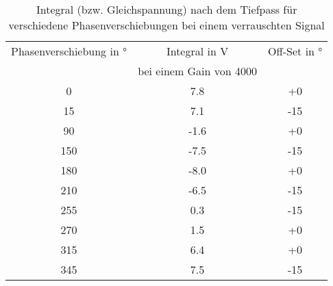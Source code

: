 \begin{table}[h!]
	\begin{center}
		\begin{tabular}{c | c | c}
			Phasenverschiebung in \si{\degree} & Integral in \si{\volt} & Off-Set in \si{\degree} \\
			 & bei einem Gain von 4000 & \\
			\hline
			0   & 7.8 & +0 \\
			15  & 7.1 & -15 \\
			90  & -1.6 & +0 \\
			150 & -7.5 & -15 \\
			180 & -8.0 & +0 \\
			210 & -6.5 & -15 \\
			255 & 0.3 & -15 \\
			270 & 1.5 & +0 \\
			315 & 6.4 & +0 \\
			345 & 7.5 & -15
		\end{tabular}
		\caption{Integral (bzw. Gleichspannung) nach dem Tiefpass für verschiedene Phasenverschiebungen bei einem verrauschten Signal}
		\label{Integral_mit}
	\end{center}
\end{table}